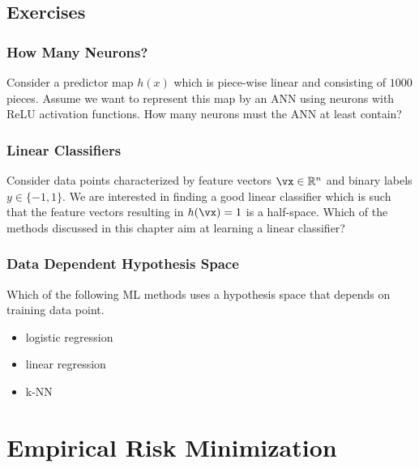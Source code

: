 \documentclass[12pt]{report}
\begin{document}
\section{Exercises}

\subsection{How Many Neurons?} 
\label{exercise_how_many_neurons} 
Consider a predictor map $h(x)$ which is piece-wise linear and consisting 
of $1000$ pieces. Assume we want to represent this map by an ANN using 
neurons with ReLU activation functions. How many neurons must the ANN 
at least contain?

\subsection{Linear Classifiers} 
\label{exercise_linear_classifier} 
Consider data points characterized by feature vectors $\vx \in \mathbb{R}^{n}$ and 
binary labels $y \in\{-1,1\}$. We are interested in finding a good linear classifier which is such that 
the feature vectors resulting in $h(\vx) = 1$ is a half-space. Which of the methods 
discussed in this chapter aim at learning a linear classifier?


\subsection{Data Dependent Hypothesis Space} 
\label{exercise_data_dep_hypospace} 
Which of the following ML methods uses a hypothesis space that depends on  
training data point. 
\begin{itemize} 
	\item logistic regression 
	\item linear regression 
	\item k-NN 
\end{itemize}


\newpage
\chapter{Empirical Risk Minimization}
\label{ch_Optimization}
\end{document}
